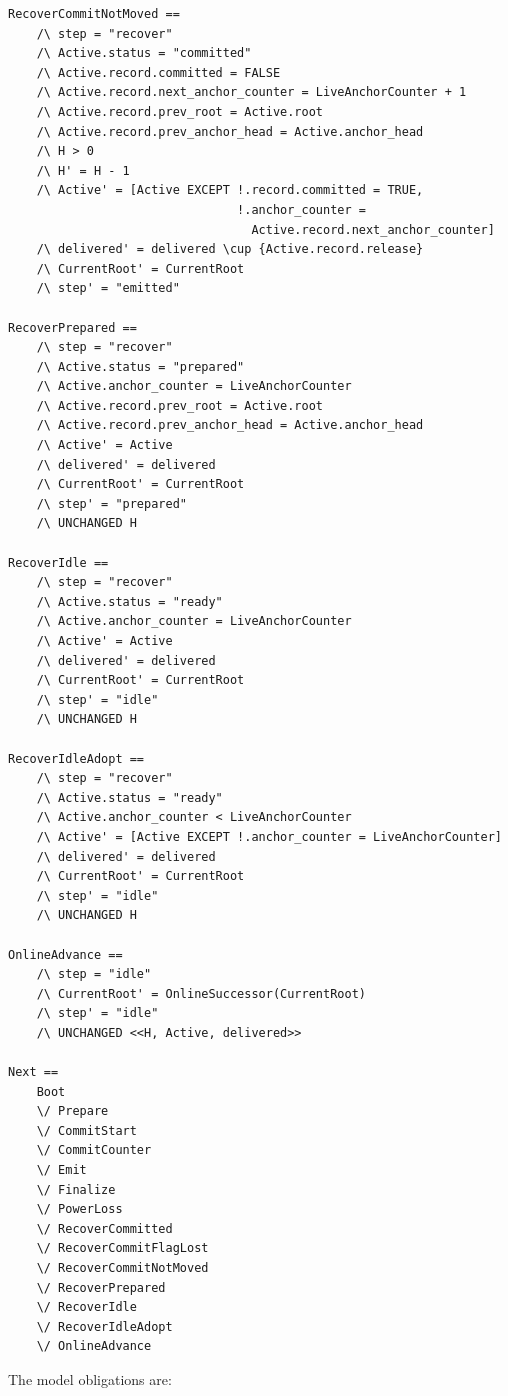 \documentclass[11pt]{article}
\theoremstyle{definition}
\theoremstyle{remark}
\begin{document}
\begin{lstlisting}[language=TLA]
RecoverCommitNotMoved ==
    /\ step = "recover"
    /\ Active.status = "committed"
    /\ Active.record.committed = FALSE
    /\ Active.record.next_anchor_counter = LiveAnchorCounter + 1
    /\ Active.record.prev_root = Active.root
    /\ Active.record.prev_anchor_head = Active.anchor_head
    /\ H > 0
    /\ H' = H - 1
    /\ Active' = [Active EXCEPT !.record.committed = TRUE,
                                !.anchor_counter =
                                  Active.record.next_anchor_counter]
    /\ delivered' = delivered \cup {Active.record.release}
    /\ CurrentRoot' = CurrentRoot
    /\ step' = "emitted"

RecoverPrepared ==
    /\ step = "recover"
    /\ Active.status = "prepared"
    /\ Active.anchor_counter = LiveAnchorCounter
    /\ Active.record.prev_root = Active.root
    /\ Active.record.prev_anchor_head = Active.anchor_head
    /\ Active' = Active
    /\ delivered' = delivered
    /\ CurrentRoot' = CurrentRoot
    /\ step' = "prepared"
    /\ UNCHANGED H

RecoverIdle ==
    /\ step = "recover"
    /\ Active.status = "ready"
    /\ Active.anchor_counter = LiveAnchorCounter
    /\ Active' = Active
    /\ delivered' = delivered
    /\ CurrentRoot' = CurrentRoot
    /\ step' = "idle"
    /\ UNCHANGED H

RecoverIdleAdopt ==
    /\ step = "recover"
    /\ Active.status = "ready"
    /\ Active.anchor_counter < LiveAnchorCounter
    /\ Active' = [Active EXCEPT !.anchor_counter = LiveAnchorCounter]
    /\ delivered' = delivered
    /\ CurrentRoot' = CurrentRoot
    /\ step' = "idle"
    /\ UNCHANGED H

OnlineAdvance ==
    /\ step = "idle"
    /\ CurrentRoot' = OnlineSuccessor(CurrentRoot)
    /\ step' = "idle"
    /\ UNCHANGED <<H, Active, delivered>>

Next ==
    Boot
    \/ Prepare
    \/ CommitStart
    \/ CommitCounter
    \/ Emit
    \/ Finalize
    \/ PowerLoss
    \/ RecoverCommitted
    \/ RecoverCommitFlagLost
    \/ RecoverCommitNotMoved
    \/ RecoverPrepared
    \/ RecoverIdle
    \/ RecoverIdleAdopt
    \/ OnlineAdvance
\end{lstlisting}

The model obligations are:
\end{document}
